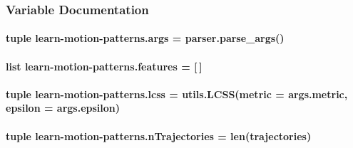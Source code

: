 \subsubsection{Variable Documentation}
\hypertarget{namespacelearn-motion-patterns_a6123b7367cecd161c4b37d4e5ade6160}{
\paragraph[{args}]{\setlength{\rightskip}{0pt plus 5cm}tuple learn-\/motion-\/patterns.\-args = parser.\-parse\-\_\-args()}}\label{namespacelearn-motion-patterns_a6123b7367cecd161c4b37d4e5ade6160}
\hypertarget{namespacelearn-motion-patterns_a1a839acfed418bb16ca2023be5596653}{
\paragraph[{features}]{\setlength{\rightskip}{0pt plus 5cm}list learn-\/motion-\/patterns.\-features = \mbox{[}$\,$\mbox{]}}}\label{namespacelearn-motion-patterns_a1a839acfed418bb16ca2023be5596653}
\hypertarget{namespacelearn-motion-patterns_a555894845c9f5033522d85dda8b35b44}{
\paragraph[{lcss}]{\setlength{\rightskip}{0pt plus 5cm}tuple learn-\/motion-\/patterns.\-lcss = utils.\-L\-C\-S\-S(metric = args.\-metric, epsilon = args.\-epsilon)}}\label{namespacelearn-motion-patterns_a555894845c9f5033522d85dda8b35b44}
\hypertarget{namespacelearn-motion-patterns_a1fab655ce5b2a25a3dc5eb15a902bf6b}{
\paragraph[{n\-Trajectories}]{\setlength{\rightskip}{0pt plus 5cm}tuple learn-\/motion-\/patterns.\-n\-Trajectories = len({\bf trajectories})}}\label{namespacelearn-motion-patterns_a1fab655ce5b2a25a3dc5eb15a902bf6b}
